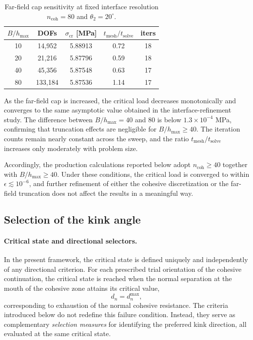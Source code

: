 \documentclass[smallextended]{svjour3}       %
\begin{document}
\begin{table}[h!]
	\centering
	\caption{Far-field cap sensitivity at fixed interface resolution
		\(n_{\mathrm{coh}}=80\) and \(\theta_2=20^\circ\).}
	\label{tab:farfield}
	\begin{tabular}{ccccc}
		\hline
		\(B/h_{\max}\) & DOFs & \(\sigma_{\mathrm{cr}}\) [MPa] &
		\(t_{\mathrm{mesh}}/t_{\mathrm{solve}}\) & iters\\
		\hline
		10 & 14,952 & 5.88913 & 0.72 & 18\\
		20 & 21,216 & 5.87796 & 0.59 & 18\\
		40 & 45,356 & 5.87548 & 0.63 & 17\\
		80 & 133,184 & 5.87536 & 1.14 & 17\\
		\hline
	\end{tabular}
\end{table}

As the far-field cap is increased, the critical load decreases
monotonically and converges to the same asymptotic value obtained in the
interface-refinement study. The difference between \(B/h_{\max}=40\) and
\(80\) is below \(1.3\times10^{-4}\) MPa, confirming that truncation
effects are negligible for \(B/h_{\max}\ge 40\). The iteration counts
remain nearly constant across the sweep, and the ratio
\(t_{\mathrm{mesh}}/t_{\mathrm{solve}}\) increases only moderately with
problem size.

Accordingly, the production calculations reported below adopt
\(n_{\mathrm{coh}}\ge 40\) together with \(B/h_{\max}\ge 40\). Under these
conditions, the critical load is converged to within
\(\epsilon\lesssim 10^{-6}\), and further refinement of either the
cohesive discretization or the far-field truncation does not affect the
results in a meaningful way.

\subsection{Selection of the kink angle}

\paragraph{Critical state and directional selectors.}
In the present framework, the critical state is defined uniquely and
independently of any directional criterion. For each prescribed trial
orientation of the cohesive continuation, the critical state is reached
when the normal separation at the mouth of the cohesive zone attains its
critical value,
\[
d_n=d_n^{\max},
\]
corresponding to exhaustion of the normal cohesive resistance. The criteria
introduced below do not redefine this failure condition. Instead, they
serve as complementary \emph{selection measures} for identifying the
preferred kink direction, all evaluated at the same critical state.
\end{document}
